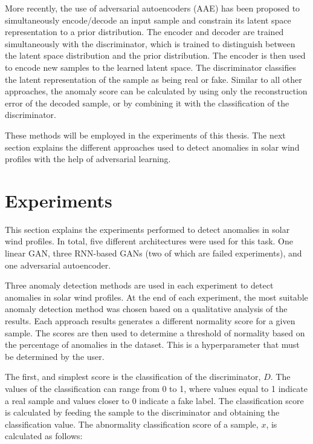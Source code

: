 More recently, the use of adversarial autoencoders (AAE) has been proposed \cite{zenati.etal_AdversariallyLearnedAnomaly_2018,wang.etal_AdVAESelfadversarialVariational_2020} to simultaneously encode/decode an input sample and constrain its latent space representation to a prior distribution. The encoder and decoder are trained simultaneously with the discriminator, which is trained to distinguish between the latent space distribution and the prior distribution. The encoder is then used to encode new samples to the learned latent space. The discriminator classifies the latent representation of the sample as being real or fake. Similar to all other approaches, the anomaly score can be calculated by using only the reconstruction error of the decoded sample, or by combining it with the classification of the discriminator.

These methods will be employed in the experiments of this thesis. The next section explains the different approaches used to detect anomalies in solar wind profiles with the help of adversarial learning.

\section{Experiments}\label{sec:gan_experiments}
This section explains the experiments performed to detect anomalies in solar wind profiles. In total, five different architectures were used for this task. One linear GAN, three RNN-based GANs (two of which are failed experiments), and one adversarial autoencoder.

Three anomaly detection methods are used in each experiment to detect anomalies in solar wind profiles. At the end of each experiment, the most suitable anomaly detection method was chosen based on a qualitative analysis of the results. Each approach results generates a different normality score for a given sample. The scores are then used to determine a threshold of normality based on the percentage of anomalies in the dataset. This is a hyperparameter that must be determined by the user.

The first, and simplest score is the classification of the discriminator, $D$. The values of the classification can range from 0 to 1, where values equal to 1 indicate a real sample and values closer to 0 indicate a fake label. The classification score is calculated by feeding the sample to the discriminator and obtaining the classification value. The abnormality classification score of a sample, $x$, is calculated as follows:

